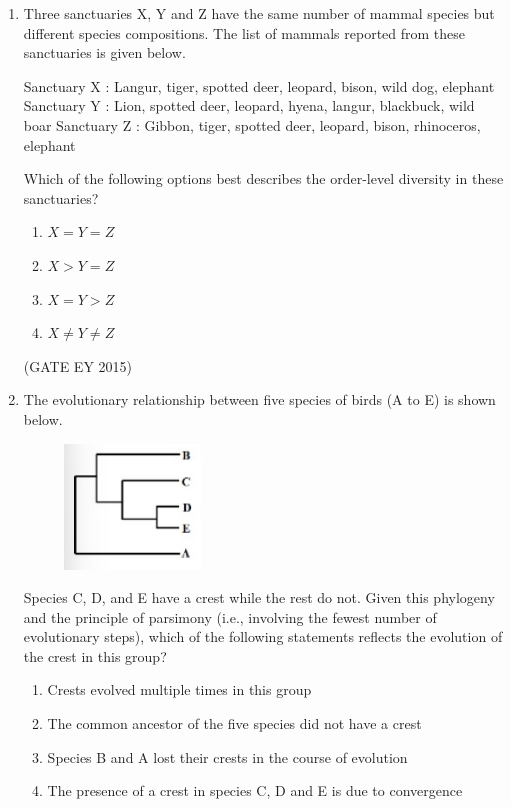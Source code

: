\documentclass[journal,12pt,onecolumn]{IEEEtran}
\theoremstyle{remark}
\begin{document}
\begin{enumerate}


\item 
Three sanctuaries X, Y and Z have the same number of mammal species but different species compositions. The list of mammals reported from these sanctuaries is given below.

Sanctuary X : Langur, tiger, spotted deer, leopard, bison, wild dog, elephant
Sanctuary Y : Lion, spotted deer, leopard, hyena, langur, blackbuck, wild boar
Sanctuary Z : Gibbon, tiger, spotted deer, leopard, bison, rhinoceros, elephant

Which of the following options best describes the order-level diversity in these sanctuaries?

\begin{multicols}{4}
\begin{enumerate}
    
\item $X=Y=Z$
\item $X>Y=Z$
\item $X=Y>Z$
\item $X\not=Y\not=Z$

    \end{enumerate}
    \end{multicols}
\hfill{(GATE EY 2015)}





\item 
The evolutionary relationship between five species of birds (A to E) is shown below.
\begin{figure}[H]
    \centering
    \includegraphics[]{figs/Q.64.png}
    \caption{}
    \label{fig:15}
\end{figure}

Species C, D, and E have a crest while the rest do not. Given this phylogeny and the principle of parsimony (i.e., involving the fewest number of evolutionary steps), which of the following statements reflects the evolution of the crest in this group?

\begin{enumerate}
    
\item  Crests evolved multiple times in this group
\item The common ancestor of the five species did not have a crest
\item Species B and A lost their crests in the course of evolution
\item The presence of a crest in species C, D and E is due to convergence


\end{enumerate}
\end{enumerate}
\end{document}
